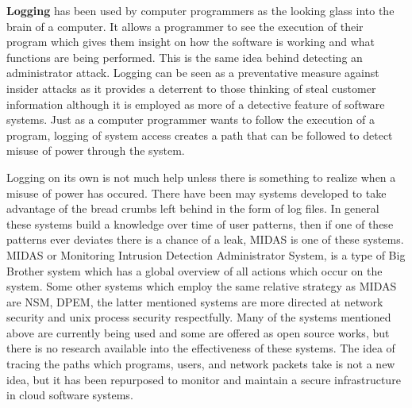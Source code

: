 \label{hlLogging}

\textbf{Logging} has been used by computer programmers as the looking glass into the brain of a computer. It allows a programmer to see the execution of their program which gives them insight on how the software is working and what functions are being performed. This is the same idea behind detecting an administrator attack. Logging can be seen as a preventative measure against insider attacks as it provides a deterrent to those thinking of steal customer information although it is employed as more of a detective feature of software systems.\cite{sirer} Just as a computer programmer wants to follow the execution of a program, logging of system access creates a path that can be followed to detect misuse of power through the system.

Logging on its own is not much help unless there is something to realize when a misuse of power has occured.\cite{althebyan} There have been may systems developed to take advantage of the bread crumbs left behind in the form of log files. In general these systems build a knowledge over time of user patterns, then if one of these patterns ever deviates there is a chance of a leak, MIDAS is one of these systems. MIDAS or Monitoring Intrusion Detection Administrator System, is a type of Big Brother system which has a global overview of all actions which occur on the system.\cite{nguyen} Some other systems which employ the same relative strategy as MIDAS are NSM, DPEM, the latter mentioned systems are more directed at network security and unix process security respectfully. Many of the systems mentioned above are currently being used and some are offered as open source works, but there is no research available into the effectiveness of these systems. The idea of tracing the paths which programs, users, and network packets take is not a new idea, but it has been repurposed to monitor and maintain a secure infrastructure in cloud software systems.\cite{nguyen}\cite{mukherjee}


\label{hlSecureHW}

